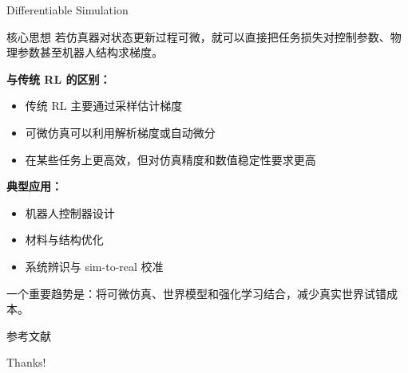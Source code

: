 \documentclass{beamer}
\begin{document}
\begin{frame}{Differentiable Simulation}
\begin{block}{核心思想}
    若仿真器对状态更新过程可微，就可以直接把任务损失对控制参数、物理参数甚至机器人结构求梯度。
\end{block}

\textbf{与传统 RL 的区别：}
\begin{itemize}
    \item 传统 RL 主要通过采样估计梯度
    \item 可微仿真可以利用解析梯度或自动微分
    \item 在某些任务上更高效，但对仿真精度和数值稳定性要求更高
\end{itemize}

\textbf{典型应用：}
\begin{itemize}
    \item 机器人控制器设计
    \item 材料与结构优化
    \item 系统辨识与 sim-to-real 校准
\end{itemize}
\vspace{0.15cm}
{\small 一个重要趋势是：将可微仿真、世界模型和强化学习结合，减少真实世界试错成本。}
\end{frame}

\begin{frame}[allowframebreaks]{参考文献}
    \tiny
        
\end{frame}

\begin{frame}
    \begin{center}
        {\Huge\calligra Thanks!}
    \end{center}
\end{frame}
\end{document}
